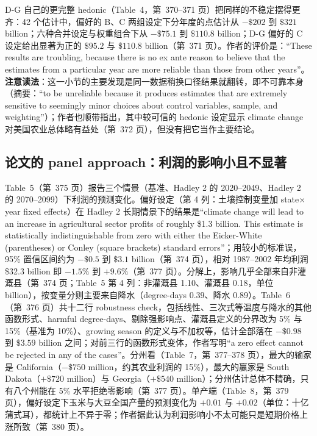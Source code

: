 D-G 自己的更完整 hedonic（Table~4，第~370--371 页）把同样的不稳定摆得更齐：42 个估计中，偏好的 B、C 两组设定下分年度的点估计从 $-\$202$ 到 $\$321$ billion；六种合并设定与权重组合下从 $-\$75.1$ 到 $\$110.8$ billion；D-G 偏好的 C 设定给出显著为正的 $\$95.2$ 与 $\$110.8$ billion（第~371 页）。作者的评价是：``These results are troubling, because there is no ex ante reason to believe that the estimates from a particular year are more reliable than those from other years''\citep[第~371 页]{deschenes2007economic}。\textbf{注意读法}：这一小节的主要发现是同一数据稍换口径结果就翻转，即不可靠本身（摘要：``to be unreliable because it produces estimates that are extremely sensitive to seemingly minor choices about control variables, sample, and weighting''\citep[第~354 页]{deschenes2007economic}）；作者也顺带指出，其中较可信的 hedonic 设定显示 climate change 对美国农业总体略有益处（第~372 页），但没有把它当作主要结论。

\subsection{论文的 panel approach：利润的影响小且不显著}

Table~5（第~375 页）报告三个情景（基准、Hadley 2 的 2020--2049、Hadley 2 的 2070--2099）下利润的预测变化。偏好设定（第 4 列：土壤控制变量加 state$\times$year fixed effects）在 Hadley 2 长期情景下的结果是``climate change will lead to an increase in agricultural sector profits of roughly \$1.3 billion. This estimate is statistically indistinguishable from zero with either the Eicker-White (parentheses) or Conley (square brackets) standard errors''\citep[第~374 页]{deschenes2007economic}；用较小的标准误，95\% 置信区间约为 $-\$0.5$ 到 $\$3.1$ billion（第~374 页），相对 1987--2002 年均利润 \$32.3 billion 即 $-1.5\%$ 到 $+9.6\%$（第~377 页）。分解上，影响几乎全部来自非灌溉县（第~374 页；Table~5 第 4 列：非灌溉县 1.10、灌溉县 0.18，单位 billion），按变量分则主要来自降水（degree-days 0.39、降水 0.89）。Table~6（第~376 页）共十二行 robustness check，包括线性、三次式等温度与降水的其他函数形式、harmful degree-days、剔除强影响点、灌溉县定义的分界改为 5\% 与 15\%（基准为 10\%）、growing season 的定义与不加权等，估计全部落在 $-\$0.98$ 到 $\$3.59$ billion 之间；对前三行的函数形式变体，作者写明``a zero effect cannot be rejected in any of the cases''\citep[第~376 页]{deschenes2007economic}。分州看（Table~7，第~377--378 页），最大的输家是 California（$-\$750$ million，约其农业利润的 15\%），最大的赢家是 South Dakota（$+\$720$ million）与 Georgia（$+\$540$ million）；分州估计总体不精确，只有八个州能在 5\% 水平拒绝零影响（第~377 页）。单产端（Table~8，第~379 页），偏好设定下玉米与大豆全国产量的预测变化为 $+0.01$ 与 $+0.02$（单位：十亿蒲式耳），都统计上不异于零；作者据此认为利润影响小不太可能只是短期价格上涨所致（第~380 页）。

